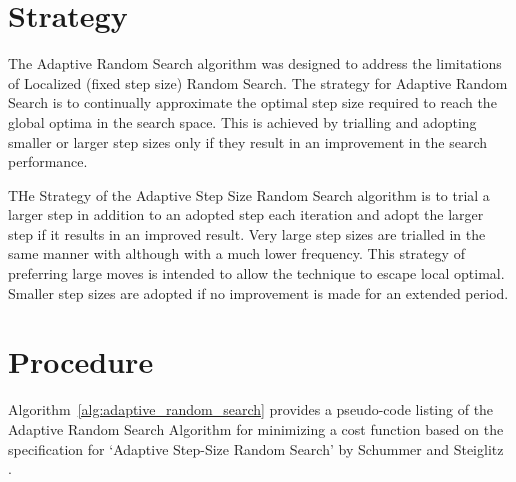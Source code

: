 \documentclass[a4paper, 11pt]{article}
\begin{document}
\section{Strategy}
\label{sec:strategy}
The Adaptive Random Search algorithm was designed to address the limitations of Localized (fixed step size) Random Search. The strategy for Adaptive Random Search is to continually approximate the optimal step size required to reach the global optima in the search space. This is achieved by trialling and adopting smaller or larger step sizes only if they result in an improvement in the search performance.

THe Strategy of the Adaptive Step Size Random Search algorithm is to trial a larger step in addition to an adopted step each iteration and adopt the larger step if it results in an improved result. Very large step sizes are trialled in the same manner with although with a much lower frequency. This strategy of preferring large moves is intended to allow the technique to escape local optimal. Smaller step sizes are adopted if no improvement is made for an extended period. 

\section{Procedure}
\label{sec:procedure}
Algorithm~\ref{alg:adaptive_random_search} provides a pseudo-code listing of the Adaptive Random Search Algorithm for minimizing a cost function based on the specification for `Adaptive Step-Size Random Search' by Schummer and Steiglitz \cite{Schumer1968}.
\end{document}
